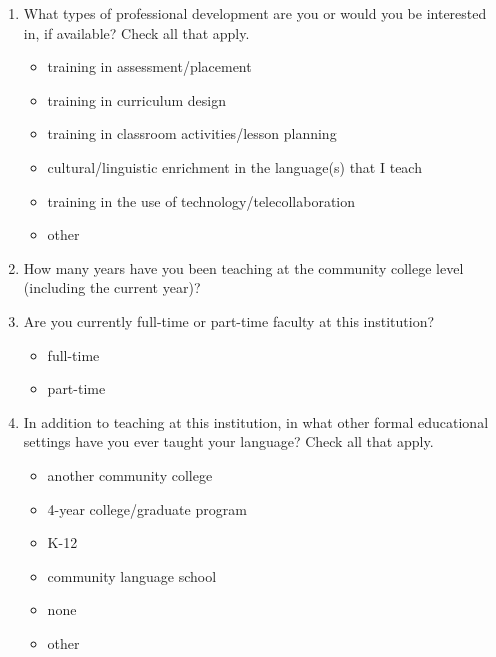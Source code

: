 \documentclass[letterpaper,10pt]{article}
\begin{document}
\begin{enumerate}[resume]
\item What types of professional development are you or would you be interested in, if available? Check all that apply.
\vspace{-0.1in}\begin{multicols}{2}
\begin{itemize}
	\item training in assessment/placement
	\item training in curriculum design
	\item training in classroom activities/lesson planning
	\item cultural/linguistic enrichment in the language(s) that I teach
	\item training in the use of technology/telecollaboration
	\item other \underline{\hspace{2in}}
\end{itemize}
\end{multicols}

\item How many years have you been teaching at the community college level (including the current year)?\\

\underline{\hspace{3.5in}}

\item Are you currently full-time or part-time faculty at this institution?
\vspace{-0.1in}\begin{multicols}{2}
\begin{itemize}
	\item full-time
	\item part-time
\end{itemize}
\end{multicols}

\item In addition to teaching at this institution, in what other formal educational settings have you ever taught your language? Check all that apply.
\vspace{-0.1in}\begin{multicols}{2}
\begin{itemize}
	\item another community college
	\item 4-year college/graduate program
	\item K-12
	\item community language school
	\item none
	\item other \underline{\hspace{2in}}
\end{itemize}
\end{multicols}


\end{enumerate}
\end{document}
